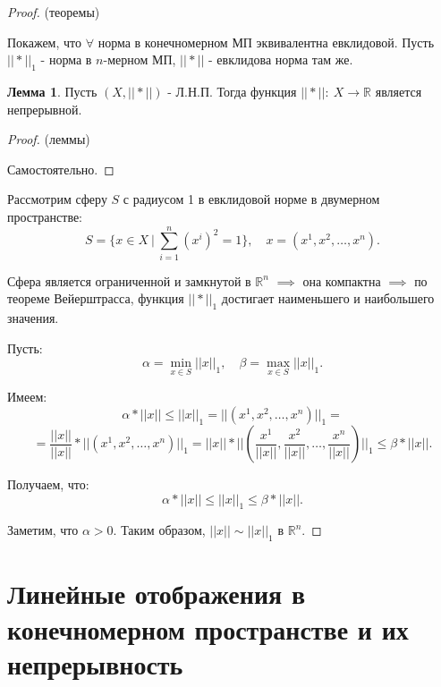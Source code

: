 \documentclass{report}
\theoremstyle{definition}
\newtheorem{lemma}{Лемма}[section]
\begin{document}
\begin{proof}
  (теоремы)

  Покажем, что $\forall$ норма в конечномерном МП эквивалентна евклидовой. Пусть $||*||_1$ - норма в $n$-мерном
  МП, $||*||$ - евклидова норма там же.
  \begin{lemma}
    Пусть $(X,||*||)$ - Л.Н.П. Тогда функция $||*||: \ X \rightarrow \mathbb{R}$ является непрерывной.
  \end{lemma}
  \begin{proof}
    (леммы)

    Самостоятельно.
  \end{proof}

  Рассмотрим сферу $S$ с радиусом 1 в евклидовой норме в двумерном пространстве:
  \begin{equation*}
    S=\{x \in X \ | \ \sum_{i=1}^{n}(x^i)^2 = 1\}, \quad x = (x^1,x^2,\ldots,x^n).
  \end{equation*}

  Сфера является ограниченной и замкнутой в $\mathbb{R}^n$ $\implies$ она компактна $\implies$ по теореме
  Вейерштрасса, функция $||*||_1$ достигает наименьшего и наибольшего значения.

  Пусть:
  \begin{equation*}
    \alpha = \underset{x\in S}{\min} ||x||_1, \quad \beta = \underset{x \in S}{\max} ||x||_1.
  \end{equation*}

  Имеем:
  \begin{equation*}
    \alpha * ||x|| \leqslant ||x||_1 = ||(x^1,x^2,\ldots,x^n)||_1 =
  \end{equation*}
  \begin{equation*}
    = \frac{||x||}{||x||} * ||(x^1,x^2,\ldots,x^n)||_1 =
    ||x|| * ||(\frac{x^1}{||x||},\frac{x^2}{||x||},\ldots,\frac{x^n}{||x||})||_1 \leqslant \beta * ||x||.
  \end{equation*}

  Получаем, что:
  \begin{equation*}
    \alpha * ||x|| \leqslant ||x||_1 \leqslant \beta * ||x||.
  \end{equation*}

  Заметим, что $\alpha > 0$. Таким образом, $||x||\sim||x||_1$ в $\mathbb{R}^n$.
\end{proof}

\section{Линейные отображения в конечномерном пространстве и их непрерывность}
\end{document}
